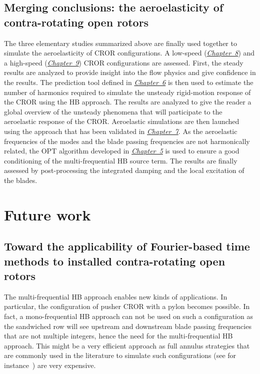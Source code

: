 \subsection*{Merging conclusions: the aeroelasticity of contra-rotating open rotors}

The three elementary studies summarized above 
are finally used together 
to simulate the aeroelasticity
of CROR configurations. A low-speed 
(\hyperref[cha:dream_ls_isolated]{\emph{Chapter~8}})
and a high-speed (\hyperref[cha:dream_hs_isolated]{\emph{Chapter~9}})
CROR configurations are assessed. First,
the steady results are analyzed to provide insight into the flow
physics and give confidence in the results. The prediction tool
defined in \hyperref[cha:limitations_convergence]{\emph{Chapter~6}}
is then used to estimate the number of harmonics required to
simulate the unsteady rigid-motion response of the CROR using the HB approach.
The results are analyzed
to give the reader a global overview of the unsteady phenomena
that will participate to the aeroelastic response of the CROR.
Aeroelastic simulations are then launched using the 
approach that has been validated in \hyperref[cha:stcf11]{\emph{Chapter~7}}.
As the aeroelastic frequencies of the modes and the blade passing frequencies
are not harmonically related, the OPT algorithm developed in 
\hyperref[cha:limitations_condition_number]{\emph{Chapter~5}}
is used to ensure a good conditioning of the multi-frequential
HB source term. 
The results are finally assessed by post-processing the integrated damping
and the local excitation of the blades.

\section*{Future work}

\subsection*{Toward the applicability of Fourier-based time methods to installed contra-rotating open rotors}

The multi-frequential HB approach enables new
kinds of applications. In particular, 
the configuration of pusher CROR with a pylon becomes possible.
In fact, a mono-frequential HB approach can not be
used on such a configuration as the sandwiched row will see upstream
and downstream
blade passing frequencies that are not multiple integers, hence
the need for the multi-frequential HB approach.
This might be a very efficient approach as full annulus
strategies that are commonly used in the literature to simulate such
configurations (see for instance~\citet{Stuermer2008})
are very expensive.

